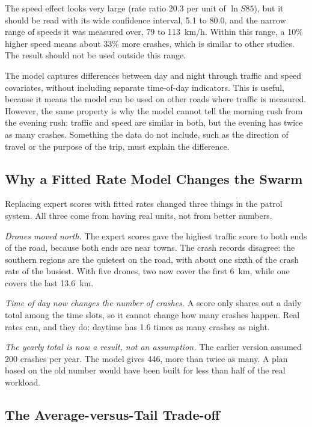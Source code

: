 \documentclass[11pt]{article}
\begin{document}
The speed effect looks very large (rate ratio 20.3 per unit of $\ln S85$), but
it should be read with its wide confidence interval, 5.1 to 80.0, and the
narrow range of speeds it was measured over, 79 to 113~km/h. Within this range,
a 10\% higher speed means about 33\% more crashes, which is similar to other
studies. The result should not be used outside this range.

The model captures differences between day and night through traffic and speed
covariates, without including separate time-of-day indicators. This is useful, because it means
the model can be used on other roads where traffic is measured. However, the
same property is why the model cannot tell the morning rush from the evening
rush: traffic and speed are similar in both, but the evening has twice as many
crashes. Something the data do not include, such as the direction of travel or
the purpose of the trip, must explain the difference.

\subsection{Why a Fitted Rate Model Changes the Swarm}

Replacing expert scores with fitted rates changed three things in the patrol
system. All three come from having real units, not from better numbers.

\emph{Drones moved north.} The expert scores gave the highest traffic score to
both ends of the road, because both ends are near towns. The crash records
disagree: the southern regions are the quietest on the road, with about one
sixth of the crash rate of the busiest. With five drones, two now cover the
first 6~km, while one covers the last 13.6~km.

\emph{Time of day now changes the number of crashes.} A score only shares out a
daily total among the time slots, so it cannot change how many crashes happen.
Real rates can, and they do: daytime has 1.6 times as many crashes as night.

\emph{The yearly total is now a result, not an assumption.} The earlier version
assumed 200 crashes per year. The model gives 446, more than twice as many. A
plan based on the old number would have been built for less than half of the
real workload.

\subsection{The Average-versus-Tail Trade-off}
\end{document}
